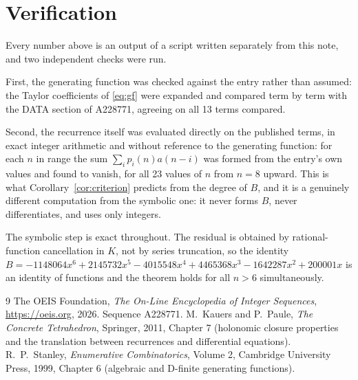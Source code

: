 \documentclass[11pt,a4paper]{article}
\theoremstyle{plain}
\theoremstyle{definition}
\begin{document}
\section{Verification}

Every number above is an output of a script written separately from this note, and two
independent checks were run.

First, the generating function was checked against the entry rather than assumed: the
Taylor coefficients of \eqref{eq:gf} were expanded and compared term by term with the DATA
section of A228771, agreeing on all 13 terms compared.

Second, the recurrence itself was evaluated directly on the published terms, in exact
integer arithmetic and without reference to the generating function: for each $n$ in range
the sum $\sum_{i}p_{i}(n)a(n-i)$ was formed from the entry's own values and found to
vanish, for all 23 values of $n$ from $n=8$ upward. This is what
Corollary~\ref{cor:criterion} predicts from the degree of $B$, and it is a genuinely
different computation from the symbolic one: it never forms $B$, never differentiates, and
uses only integers.

The symbolic step is exact throughout. The residual is obtained by rational-function
cancellation in $K$, not by series truncation, so the identity $B=- 1148064 x^{6} + 2145732 x^{5} - 4015548 x^{4} + 4465368 x^{3} - 1642287 x^{2} + 200001 x$ is an
identity of functions and the theorem holds for all $n>6$ simultaneously.

\begin{thebibliography}{9}
 The OEIS Foundation, \emph{The On-Line Encyclopedia of Integer Sequences},
\url{https://oeis.org}, 2026. Sequence A228771.
 M.~Kauers and P.~Paule, \emph{The Concrete Tetrahedron}, Springer, 2011,
Chapter 7 (holonomic closure properties and the translation between recurrences and
differential equations).
 R.~P.~Stanley, \emph{Enumerative Combinatorics}, Volume 2, Cambridge
University Press, 1999, Chapter 6 (algebraic and D-finite generating functions).
\end{thebibliography}
\end{document}
